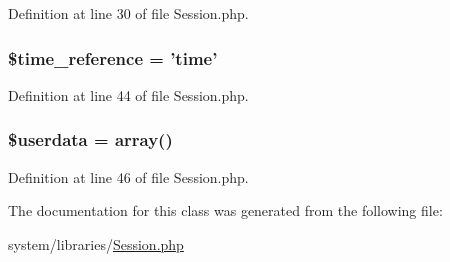 Definition at line 30 of file Session.\-php.

\hypertarget{class_c_i___session_ae76ac08d6f71ee519ff2f723489edbad}{
\subsubsection[{\$time\-\_\-reference}]{\setlength{\rightskip}{0pt plus 5cm}\$time\-\_\-reference = 'time'}}\label{class_c_i___session_ae76ac08d6f71ee519ff2f723489edbad}


Definition at line 44 of file Session.\-php.

\hypertarget{class_c_i___session_af70e594e86a310311c717b13e6ecac00}{
\subsubsection[{\$userdata}]{\setlength{\rightskip}{0pt plus 5cm}\${\bf userdata} = array()}}\label{class_c_i___session_af70e594e86a310311c717b13e6ecac00}


Definition at line 46 of file Session.\-php.



The documentation for this class was generated from the following file\-:\begin{DoxyCompactItemize}
\item 
system/libraries/\hyperlink{_session_8php}{Session.\-php}\end{DoxyCompactItemize}
